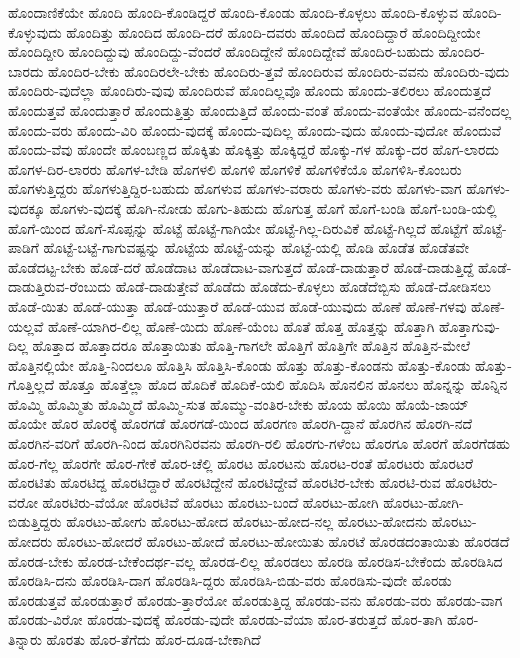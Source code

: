 {ಹೊಂದಾಣಿಕೆಯೇ
ಹೊಂದಿ
ಹೊಂದಿ-ಕೊಂಡಿದ್ದರೆ
ಹೊಂದಿ-ಕೊಂಡು
ಹೊಂದಿ-ಕೊಳ್ಳಲು
ಹೊಂದಿ-ಕೊಳ್ಳುವ
ಹೊಂದಿ-ಕೊಳ್ಳುವುದು
ಹೊಂದಿತ್ತು
ಹೊಂದಿದ
ಹೊಂದಿ-ದರೆ
ಹೊಂದಿ-ದವರು
ಹೊಂದಿದೆ
ಹೊಂದಿದ್ದಾರೆ
ಹೊಂದಿದ್ದೀಯೇ
ಹೊಂದಿದ್ದೀರಿ
ಹೊಂದಿದ್ದುವು
ಹೊಂದಿದ್ದು-ವೆಂದರೆ
ಹೊಂದಿದ್ದೇನೆ
ಹೊಂದಿದ್ದೇವೆ
ಹೊಂದಿರ-ಬಹುದು
ಹೊಂದಿರ-ಬಾರದು
ಹೊಂದಿರ-ಬೇಕು
ಹೊಂದಿರಲೇ-ಬೇಕು
ಹೊಂದಿರು-ತ್ತವೆ
ಹೊಂದಿರುವ
ಹೊಂದಿರು-ವವನು
ಹೊಂದಿರು-ವುದು
ಹೊಂದಿರು-ವುದೆಲ್ಲಾ
ಹೊಂದಿರು-ವುವು
ಹೊಂದಿರುವೆ
ಹೊಂದಿಲ್ಲವೊ
ಹೊಂದು
ಹೊಂದು-ತಲಿರಲು
ಹೊಂದುತ್ತದೆ
ಹೊಂದುತ್ತವೆ
ಹೊಂದುತ್ತಾರೆ
ಹೊಂದುತ್ತಿತ್ತು
ಹೊಂದುತ್ತಿದೆ
ಹೊಂದು-ವಂತೆ
ಹೊಂದು-ವಂತೆಯೇ
ಹೊಂದು-ವನೆಂದಲ್ಲ
ಹೊಂದು-ವರು
ಹೊಂದು-ವಿರಿ
ಹೊಂದು-ವುದಕ್ಕೆ
ಹೊಂದು-ವುದಿಲ್ಲ
ಹೊಂದು-ವುದು
ಹೊಂದು-ವುದೋ
ಹೊಂದುವೆ
ಹೊಂದು-ವೆವು
ಹೊಂದೇ
ಹೊಂಬಣ್ಣದ
ಹೊಕ್ಕಿತು
ಹೊಕ್ಕಿತ್ತು
ಹೊಕ್ಕಿದ್ದರೆ
ಹೊಕ್ಕು-ಗಳ
ಹೊಕ್ಕು-ದರ
ಹೊಗ-ಲಾರದು
ಹೊಗಳ-ದಿರ-ಲಾರರು
ಹೊಗಳ-ಬೇಡಿ
ಹೊಗಳಲಿ
ಹೊಗಳಿ
ಹೊಗಳಿಕೆ
ಹೊಗಳಿಕೆಯೊ
ಹೊಗಳಿಸಿ-ಕೊಂಬರು
ಹೊಗಳುತ್ತಿದ್ದರು
ಹೊಗಳುತ್ತಿದ್ದಿರ-ಬಹುದು
ಹೊಗಳುವ
ಹೊಗಳು-ವರಾರು
ಹೊಗಳು-ವರು
ಹೊಗಳು-ವಾಗ
ಹೊಗಳು-ವುದಕ್ಕೂ
ಹೊಗಳು-ವುದಕ್ಕೆ
ಹೊಗಿ-ನೋಡು
ಹೊಗು-ತಿಹುದು
ಹೊಗುತ್ತ
ಹೊಗೆ
ಹೊಗೆ-ಬಂಡಿ
ಹೊಗೆ-ಬಂಡಿ-ಯಲ್ಲಿ
ಹೊಗೆ-ಯಿಂದ
ಹೊಗೆ-ಸೊಪ್ಪನ್ನು
ಹೊಟ್ಟೆ
ಹೊಟ್ಟೆ-ಗಾಗಿಯೇ
ಹೊಟ್ಟೆ-ಗಿಲ್ಲ-ದಿರುವಿಕೆ
ಹೊಟ್ಟೆ-ಗಿಲ್ಲದೆ
ಹೊಟ್ಟೆಗೆ
ಹೊಟ್ಟೆ-ಪಾಡಿಗೆ
ಹೊಟ್ಟೆ-ಬಟ್ಟೆ-ಗಾಗುವಷ್ಟನ್ನು
ಹೊಟ್ಟೆಯ
ಹೊಟ್ಟೆ-ಯನ್ನು
ಹೊಟ್ಟೆ-ಯಲ್ಲಿ
ಹೊಡಿ
ಹೊಡೆತ
ಹೊಡೆತವೇ
ಹೊಡೆದಟ್ಟ-ಬೇಕು
ಹೊಡೆ-ದರೆ
ಹೊಡೆದಾಟ
ಹೊಡೆದಾಟ-ವಾಗುತ್ತದೆ
ಹೊಡೆ-ದಾಡುತ್ತಾರೆ
ಹೊಡೆ-ದಾಡುತ್ತಿದ್ದೆ
ಹೊಡೆ-ದಾಡುತ್ತಿರುವ-ರೆಂಬುದು
ಹೊಡೆ-ದಾಡುತ್ತೇವೆ
ಹೊಡೆದು
ಹೊಡೆದು-ಕೊಳ್ಳಲು
ಹೊಡೆದೆಬ್ಬಿಸು
ಹೊಡೆ-ದೋಡಿಸಲು
ಹೊಡೆ-ಯಿತು
ಹೊಡೆ-ಯುತ್ತಾ
ಹೊಡೆ-ಯುತ್ತಾರೆ
ಹೊಡೆ-ಯುವ
ಹೊಡೆ-ಯುವುದು
ಹೊಣೆ
ಹೊಣೆ-ಗಳವು
ಹೊಣೆ-ಯಲ್ಲವೆ
ಹೊಣೆ-ಯಾಗಿರ-ಲಿಲ್ಲ
ಹೊಣೆ-ಯಿದು
ಹೊಣೆ-ಯೆಂಬ
ಹೊತೆ
ಹೊತ್ತ
ಹೊತ್ತನ್ನು
ಹೊತ್ತಾಗಿ
ಹೊತ್ತಾಗುವು-ದಿಲ್ಲ
ಹೊತ್ತಾದ
ಹೊತ್ತಾದರೂ
ಹೊತ್ತಾಯಿತು
ಹೊತ್ತಿ-ಗಾಗಲೇ
ಹೊತ್ತಿಗೆ
ಹೊತ್ತಿಗೇ
ಹೊತ್ತಿನ
ಹೊತ್ತಿನ-ಮೇಲೆ
ಹೊತ್ತಿನಲ್ಲಿಯೇ
ಹೊತ್ತಿ-ನಿಂದಲೂ
ಹೊತ್ತಿಸಿ
ಹೊತ್ತಿಸಿ-ಕೊಂಡು
ಹೊತ್ತು
ಹೊತ್ತು-ಕೊಂಡನು
ಹೊತ್ತು-ಕೊಂಡು
ಹೊತ್ತು-ಗೊತ್ತಿಲ್ಲದೆ
ಹೊತ್ತೂ
ಹೊತ್ತೆಲ್ಲಾ
ಹೊದ
ಹೊದಿಕೆ
ಹೊದಿಕೆ-ಯಲಿ
ಹೊದಿಸಿ
ಹೊನಲಿನ
ಹೊನಲು
ಹೊನ್ನನ್ನು
ಹೊನ್ನಿನ
ಹೊಮ್ಮಿ
ಹೊಮ್ಮಿತು
ಹೊಮ್ಮಿದೆ
ಹೊಮ್ಮಿ-ಸುತ
ಹೊಮ್ಮು-ವಂತಿರ-ಬೇಕು
ಹೊಯ
ಹೊಯಿ
ಹೊಯೆ-ಜಾಯ್
ಹೊಯೇ
ಹೊರ
ಹೊರಕ್ಕೆ
ಹೊರಗಡೆ
ಹೊರಗಡೆ-ಯಿಂದ
ಹೊರಗಣ
ಹೊರಗಿ-ದ್ದಾನೆ
ಹೊರಗಿನ
ಹೊರಗಿ-ನದೆ
ಹೊರಗಿನ-ವರಿಗೆ
ಹೊರಗಿ-ನಿಂದ
ಹೊರಗಿನಿರವನು
ಹೊರಗಿ-ರಲಿ
ಹೊರಗು-ಗಳೆಂಬ
ಹೊರಗೂ
ಹೊರಗೆ
ಹೊರಗೆಡಹು
ಹೊರ-ಗೆಲ್ಲ
ಹೊರಗೇ
ಹೊರ-ಗೇಕೆ
ಹೊರ-ಚೆಲ್ಲಿ
ಹೊರಟ
ಹೊರಟನು
ಹೊರಟ-ರಂತೆ
ಹೊರಟರು
ಹೊರಟರೆ
ಹೊರಟಿತು
ಹೊರಟಿದ್ದ
ಹೊರಟಿದ್ದಾರೆ
ಹೊರಟಿದ್ದೇನೆ
ಹೊರಟಿದ್ದೇವೆ
ಹೊರಟಿರ-ಬೇಕು
ಹೊರಟಿ-ರುವ
ಹೊರಟಿರು-ವರೋ
ಹೊರಟಿರು-ವೆಯೋ
ಹೊರಟಿವೆ
ಹೊರಟು
ಹೊರಟು-ಬಂದೆ
ಹೊರಟು-ಹೋಗಿ
ಹೊರಟು-ಹೋಗಿ-ಬಿಡುತ್ತಿದ್ದರು
ಹೊರಟು-ಹೋಗು
ಹೊರಟು-ಹೋದ
ಹೊರಟು-ಹೋದ-ನಲ್ಲ
ಹೊರಟು-ಹೋದನು
ಹೊರಟು-ಹೋದರು
ಹೊರಟು-ಹೋದರೆ
ಹೊರಟು-ಹೋದೆ
ಹೊರಟು-ಹೋಯಿತು
ಹೊರಟೆ
ಹೊರಡದಂತಾಯಿತು
ಹೊರಡದೆ
ಹೊರಡ-ಬೇಕು
ಹೊರಡ-ಬೇಕೆಂದರ್ಥ-ವಲ್ಲ
ಹೊರಡ-ಲಿಲ್ಲ
ಹೊರಡಲು
ಹೊರಡಿ
ಹೊರಡಿಸ-ಬೇಕೆಂದು
ಹೊರಡಿಸಿದ
ಹೊರಡಿಸಿ-ದನು
ಹೊರಡಿಸಿ-ದಾಗ
ಹೊರಡಿಸಿ-ದ್ದರು
ಹೊರಡಿಸಿ-ಬಿಡು-ವರು
ಹೊರಡಿಸು-ವುದೇ
ಹೊರಡು
ಹೊರಡುತ್ತವೆ
ಹೊರಡುತ್ತಾರೆ
ಹೊರಡು-ತ್ತಾರೆಯೋ
ಹೊರಡುತ್ತಿದ್ದ
ಹೊರಡು-ವನು
ಹೊರಡು-ವರು
ಹೊರಡು-ವಾಗ
ಹೊರಡು-ವಿರೋ
ಹೊರಡು-ವುದಕ್ಕೆ
ಹೊರಡು-ವುದೇ
ಹೊರಡು-ವೆಯಾ
ಹೊರ-ತರುತ್ತದೆ
ಹೊರ-ತಾಗಿ
ಹೊರ-ತಿನ್ನಾರು
ಹೊರತು
ಹೊರ-ತೆಗೆದು
ಹೊರ-ದೂಡ-ಬೇಕಾಗಿದೆ
}
